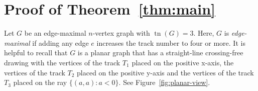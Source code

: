 \documentclass{jgaa-art}
\newcommand{\figref}[1]{\mbox{Figure~\ref{fig:#1}}}
\newcommand{\thmref}[1]{Theorem~\ref{thm:#1}}
\DeclareMathOperator{\tr}{tn}
\begin{document}
%
%
%
%
%
%


\section{Proof of \thmref{main}}

Let $G$ be an edge-maximal $n$-vertex graph with $\tr(G)=3$.
Here, $G$ is \emph{edge-maximal} if adding any edge $e$ increases the track number to four or more. It is
helpful to recall that $G$ is a planar graph that has a straight-line
crossing-free drawing with the vertices of the track $T_1$ placed on the positive x-axis,
the vertices of the track $T_2$ placed on the positive y-axis and the vertices of
the track $T_3$ placed on the ray $\{(a,a):a<0\}$. See \figref{planar-view}.
\end{document}
